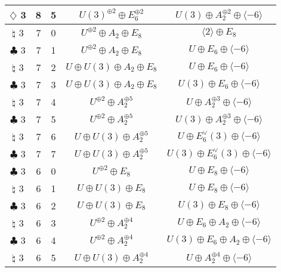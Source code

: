 \documentclass{amsart}
\theoremstyle{definition}
\begin{document}
\begin{table}[p]
\begin{tabular}{c|c|c|c|c}
 $\diamondsuit$ 3&8&5&$U(3)^{\oplus 2}\oplus E_6^{\oplus 2}$&$U(3)\oplus A_2^{\oplus 2} \oplus \langle -6\rangle$\\
 
 \hline
 
 $\natural$ 3&7&0&$ U^{\oplus 2} \oplus A_2\oplus E_8 $&$\langle 2\rangle \oplus E_8$\\ 
 
 $\clubsuit$ 3&7&1&$ U^{\oplus 2} \oplus A_2\oplus E_8$&$U\oplus E_6\oplus \langle -6\rangle$\\
 
 $\natural$ 3&7&2&$U\oplus U(3)\oplus A_2\oplus E_8$&$U\oplus E_6\oplus \langle -6\rangle$\\
 
 $\clubsuit$ 3&7&3& $U\oplus U(3)\oplus A_2\oplus E_8$&$U(3) \oplus E_6 \oplus \langle -6\rangle$\\
 
 $\natural$ 3&7&4&$U^{\oplus 2} \oplus A_2^{\oplus 5}$&$U \oplus A_2^{\oplus 3}\oplus \langle -6\rangle$\\
  
 $\clubsuit$ 3&7&5&$U^{\oplus 2} \oplus A_2^{\oplus 5}$&$U(3)\oplus A_2^{\oplus 3}\oplus \langle -6\rangle$\\
 
 $\natural$ 3&7&6&$U\oplus U(3)\oplus A_2^{\oplus 5}$&$U\oplus E_6^\vee(3)\oplus \langle -6\rangle$\\
 
 $\clubsuit$ 3&7&7&$U\oplus U(3)\oplus A_2^{\oplus 5}$&$U(3)\oplus E_6^\vee(3)\oplus \langle -6\rangle$\\
 \hline
 $\clubsuit$ 3&6&0&$U^{\oplus 2} \oplus E_8$&$U\oplus E_8\oplus \langle -6\rangle$\\
 
 $\natural$ 3&6&1&$U\oplus U(3)\oplus E_8$&$U\oplus E_8\oplus \langle -6\rangle$\\
 
 $\clubsuit$ 3&6&2&$U\oplus U(3)\oplus E_8$&$U(3)\oplus E_8\oplus \langle -6\rangle$\\
 
 $\natural$ 3&6&3&$U^{\oplus 2} \oplus A_2^{\oplus 4}$&$U\oplus E_6\oplus A_2\oplus \langle -6\rangle$\\
 
 $\clubsuit$ 3&6&4&$U^{\oplus 2} \oplus A_2^{\oplus 4}$&$U(3)\oplus E_6 \oplus A_2\oplus \langle -6\rangle$\\
 
 $\natural$ 3&6&5&$U\oplus U(3)\oplus  A_2^{\oplus 4}$&$U\oplus A_2^{\oplus 4}\oplus \langle -6\rangle$\\
 

\end{tabular}
\end{table}
\end{document}
